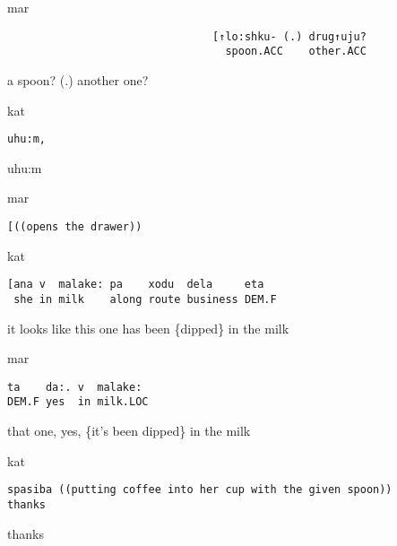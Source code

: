 \documentclass[output=paper,modfonts,nonflat]{langsci/langscibook}
\begin{document}
%
\begin{mdframednoverticalspace}[style=secondfoc]
\begin{transbox}{9}{mar}
\begin{verbatim}
                                [↑lo:shku- (.) drug↑uju?
                                  spoon.ACC    other.ACC
\end{verbatim}
\hspace{5cm} a spoon? (.) another one?
\end{transbox}
\end{mdframednoverticalspace}
%
\begin{mdframednoverticalspace}[style=firstfoc]
\begin{transbox}{10}{kat}
\begin{verbatim}
uhu:m,
\end{verbatim}
uhu:m
\end{transbox}
\end{mdframednoverticalspace}
%
\begin{mdframednoverticalspace}[style=secondfoc]
\begin{transbox}{11}{mar}
\begin{verbatim}
[((opens the drawer))
\end{verbatim}
\end{transbox}
\end{mdframednoverticalspace}
%
\begin{mdframednoverticalspace}[style=firstfoc]
\begin{transbox}{12}{kat}
\begin{verbatim}
[ana v  malake: pa    xodu  dela     eta
 she in milk    along route business DEM.F
\end{verbatim}
\hspace{0.07cm} it looks like this one has been \{dipped\} in the milk
\end{transbox}
\end{mdframednoverticalspace}
%
\begin{transbox}{13}{mar}
\begin{verbatim}
ta    da:. v  malake:
DEM.F yes  in milk.LOC
\end{verbatim}
that one, yes, \{it’s been dipped\} in the milk
\end{transbox}
%
\begin{mdframednoverticalspace}[style=secondfoc]
\end{mdframednoverticalspace}\vspace{-1mm}
%
\begin{transbox}{15}{kat}
\begin{verbatim}
spasiba ((putting coffee into her cup with the given spoon))
thanks
\end{verbatim}
thanks
\end{transbox}\bigskip
\end{document}
